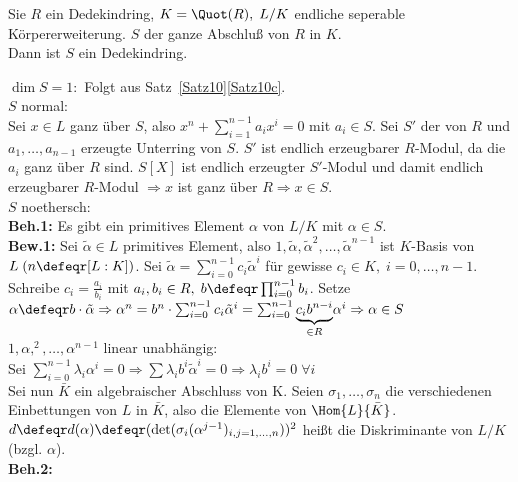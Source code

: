 \begin{Satz} 
Sie $R$ ein Dedekindring, $K = \Quot(R), \; L/K$ endliche seperable
Körpererweiterung.
$S$ der ganze Abschluß von $R$ in $K$.\\
Dann ist $S$ ein Dedekindring.
\end{Satz}

\begin{Bew} 
$\dim S=1:$ Folgt aus Satz~\ref*{Satz10}\ref*{Satz10c}.\\
$S$ normal:\\
Sei $x\in L$ ganz über $S$, also $x^n+\sum_{i=1}^{n-1}a_i x^i = 0$ mit $a_i \in S$.
Sei $S'$ der von $R$ und $a_1,\dots,a_{n-1}$ erzeugte Unterring von $S$.
$S'$ ist endlich erzeugbarer $R$-Modul, da die $a_i$ ganz über $R$ sind.
$S[X]$ ist endlich erzeugter $S'$-Modul und damit endlich erzeugbarer $R$-Modul $\Rightarrow x$ ist ganz über $R \Rightarrow x \in S$.\\
$S$ noethersch:\\
\textbf{Beh.1:} Es gibt ein primitives Element $\alpha$ von $L/K$ mit $\alpha \in S$.\\
\textbf{Bew.1:} Sei $\tilde{\alpha} \in L$ primitives Element, also $1, \tilde{\alpha}, \tilde{\alpha}^2, \dots, \tilde{\alpha}^{n-1}$ ist $K$-Basis von $L \; (n \defeqr [L:K])$.
Sei $\tilde{\alpha} = \sum_{i=0}^{n-1} c_i \tilde{\alpha}^i$ für gewisse $c_i \in K, \; i = 0, \dots, n-1$.
Schreibe $c_i = \frac{a_i}{b_i}$ mit $a_i, b_i \in R, \; b \defeqr \prod_{i=0}^{n-1} b_i$.
Setze $\alpha \defeqr b \cdot \tilde{\alpha} \Rightarrow \alpha^n = b^n \cdot
\sum_{i=0}^{n-1} c_i \tilde{\alpha}^i = \sum_{i=0}^{n-1} \underset{\in
R}{\underbrace{c_i b^{n-i}}}\alpha^i \Rightarrow \alpha \in S$\\
$1, \alpha, ^2, \dots, \alpha^{n-1}$ linear unabhängig:\\
Sei $\sum_{i=0}^{n-1} \lambda_i \alpha^i = 0 \Rightarrow \sum \lambda_i b^i
\tilde{\alpha}^i = 0 \Rightarrow \lambda_i b^i = 0 \; \forall i$\\
Sei nun $\bar{K}$ ein algebraischer Abschluss von K.
Seien $\sigma_1, \dots, \sigma_n$ die verschiedenen Einbettungen von $L$ in
$\bar{K}$, also die Elemente von $\Hom{L}{\bar{K}}$.\\
$d \defeqr d(\alpha) \defeqr (\det(\sigma_i(\alpha^{j-1})_{i,j=1, \dots, n}))^2$
heißt die Diskriminante von $L/K$ (bzgl. $\alpha$).\\
\textbf{Beh.2:}
\end{Bew}

